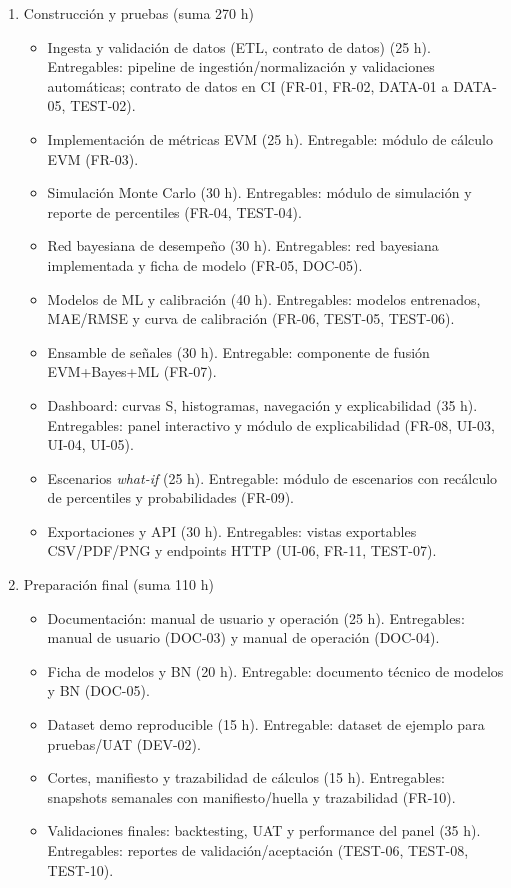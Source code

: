 \documentclass[12pt]
{charter}
\begin{document}
\begin{enumerate}
  \item Construcción y pruebas (suma 270 h)
    \begin{itemize}
      \item Ingesta y validación de datos (ETL, contrato de datos) (25 h). Entregables: pipeline de ingestión/normalización y validaciones automáticas; contrato de datos en CI (FR-01, FR-02, DATA-01 a DATA-05, TEST-02).
      \item Implementación de métricas EVM (25 h). Entregable: módulo de cálculo EVM (FR-03).
      \item Simulación Monte Carlo (30 h). Entregables: módulo de simulación y reporte de percentiles (FR-04, TEST-04).
      \item Red bayesiana de desempeño (30 h). Entregables: red bayesiana implementada y ficha de modelo (FR-05, DOC-05).
      \item Modelos de ML y calibración (40 h). Entregables: modelos entrenados, MAE/RMSE y curva de calibración (FR-06, TEST-05, TEST-06).
      \item Ensamble de señales (30 h). Entregable: componente de fusión EVM+Bayes+ML (FR-07).
      \item Dashboard: curvas S, histogramas, navegación y explicabilidad (35 h). Entregables: panel interactivo y módulo de explicabilidad (FR-08, UI-03, UI-04, UI-05).
      \item Escenarios \textit{what-if} (25 h). Entregable: módulo de escenarios con recálculo de percentiles y probabilidades (FR-09).
      \item Exportaciones y API (30 h). Entregables: vistas exportables CSV/PDF/PNG y endpoints HTTP (UI-06, FR-11, TEST-07).
    \end{itemize}

  \item Preparación final (suma 110 h)
    \begin{itemize}
      \item Documentación: manual de usuario y operación (25 h). Entregables: manual de usuario (DOC-03) y manual de operación (DOC-04).
      \item Ficha de modelos y BN (20 h). Entregable: documento técnico de modelos y BN (DOC-05).
      \item Dataset demo reproducible (15 h). Entregable: dataset de ejemplo para pruebas/UAT (DEV-02).
      \item Cortes, manifiesto y trazabilidad de cálculos (15 h). Entregables: snapshots semanales con manifiesto/huella y trazabilidad (FR-10).
      \item Validaciones finales: backtesting, UAT y performance del panel (35 h). Entregables: reportes de validación/aceptación (TEST-06, TEST-08, TEST-10).
    \end{itemize}


\end{enumerate}
\end{document}
